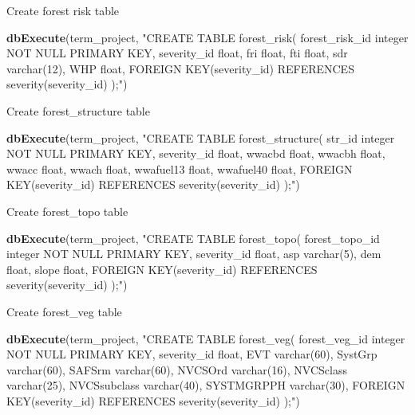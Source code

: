 \documentclass[]{book}
\newenvironment{Shaded}{\begin{snugshade}}{\end{snugshade}}
\newcommand{\KeywordTok}[1]{\textcolor[rgb]{0.13,0.29,0.53}{\textbf{#1}}}
\newcommand{\NormalTok}[1]{#1}
\newcommand{\StringTok}[1]{\textcolor[rgb]{0.31,0.60,0.02}{#1}}
\begin{document}
Create forest risk table

\begin{Shaded}
\begin{Highlighting}[]
\KeywordTok{dbExecute}\NormalTok{(term_project, }\StringTok{"CREATE TABLE forest_risk(}
\StringTok{forest_risk_id integer NOT NULL PRIMARY KEY,}
\StringTok{severity_id float,}
\StringTok{fri float,}
\StringTok{fti float,}
\StringTok{sdr varchar(12),}
\StringTok{WHP float,}
\StringTok{FOREIGN KEY(severity_id) REFERENCES severity(severity_id)}
\StringTok{);"}\NormalTok{)}
\end{Highlighting}
\end{Shaded}

Create forest\_structure table

\begin{Shaded}
\begin{Highlighting}[]
\KeywordTok{dbExecute}\NormalTok{(term_project, }\StringTok{"CREATE TABLE forest_structure(}
\StringTok{str_id integer NOT NULL PRIMARY KEY,}
\StringTok{severity_id float,}
\StringTok{wwacbd float,}
\StringTok{wwacbh float,}
\StringTok{wwacc float,}
\StringTok{wwach float,}
\StringTok{wwafuel13 float,}
\StringTok{wwafuel40 float,}
\StringTok{FOREIGN KEY(severity_id) REFERENCES severity(severity_id)}
\StringTok{);"}\NormalTok{)}
\end{Highlighting}
\end{Shaded}

Create forest\_topo table

\begin{Shaded}
\begin{Highlighting}[]
\KeywordTok{dbExecute}\NormalTok{(term_project, }\StringTok{"CREATE TABLE forest_topo(}
\StringTok{forest_topo_id integer NOT NULL PRIMARY KEY,}
\StringTok{severity_id float,}
\StringTok{asp varchar(5),}
\StringTok{dem float,}
\StringTok{slope float,}
\StringTok{FOREIGN KEY(severity_id) REFERENCES severity(severity_id)}
\StringTok{);"}\NormalTok{)}
\end{Highlighting}
\end{Shaded}

Create forest\_veg table

\begin{Shaded}
\begin{Highlighting}[]
\KeywordTok{dbExecute}\NormalTok{(term_project, }\StringTok{"CREATE TABLE forest_veg(}
\StringTok{forest_veg_id integer NOT NULL PRIMARY KEY,}
\StringTok{severity_id float,}
\StringTok{EVT varchar(60),}
\StringTok{SystGrp varchar(60),}
\StringTok{SAFSrm varchar(60),}
\StringTok{NVCSOrd varchar(16),}
\StringTok{NVCSclass varchar(25),}
\StringTok{NVCSsubclass varchar(40),}
\StringTok{SYSTMGRPPH varchar(30),}
\StringTok{FOREIGN KEY(severity_id) REFERENCES severity(severity_id)}
\StringTok{);"}\NormalTok{)}
\end{Highlighting}
\end{Shaded}
\end{document}
